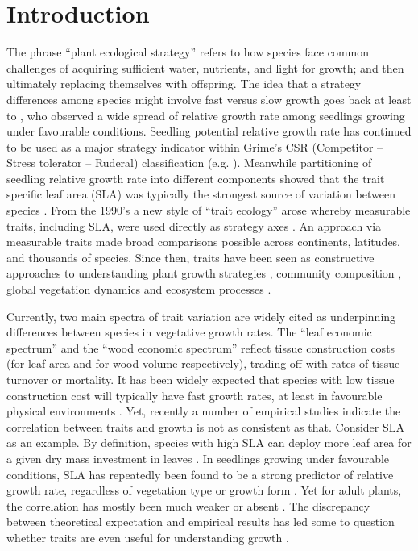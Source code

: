 \documentclass[a4paper,11pt]{article}
\begin{document}
\section*{Introduction}\label{introduction}

The phrase ``plant ecological strategy'' refers to how species face common challenges of acquiring sufficient water, nutrients, and light for growth; and then ultimately replacing themselves with offspring. The idea that a strategy differences among species might involve fast versus slow growth goes back at least to \citet{Grime:1975gr}, who observed a wide spread of relative growth rate  among seedlings growing under favourable conditions. Seedling potential relative growth rate has continued to be used as a major strategy indicator within Grime's CSR (Competitor -- Stress tolerator -- Ruderal) classification (e.g. \citealt{grime1979plant, Grime:1997wm}). Meanwhile partitioning of seedling relative growth rate into different components showed that the trait specific leaf area (SLA) was typically the strongest source of variation between species \citep{Poorter:1989tx, Rees:2010gk}. From the 1990's a new style of ``trait ecology'' arose whereby measurable traits, including SLA, were used directly as strategy axes \citep{Westoby:2002ft}. An approach via measurable traits made broad comparisons possible across continents, latitudes, and thousands of species. Since then, traits have been seen as constructive approaches to understanding plant growth strategies \citep{Westoby:2002ft}, community composition \citep{Lavorel:2002ff,Shipley:2006ie}, global vegetation dynamics \citep{Scheiter:2013ed} and ecosystem processes \citep{Lavorel:2002ff}.

Currently, two main spectra of trait variation are widely cited as underpinning differences between species in vegetative growth rates. The ``leaf economic spectrum'' \citep{Wright:2004jb} and the ``wood economic spectrum'' \citep{Chave:2009iy} reflect tissue construction costs (for leaf area and for wood volume respectively), trading off with rates of tissue turnover or mortality. It has been widely expected that species with low tissue construction cost will typically have fast growth rates, at least in favourable physical environments \citep[e.g.][]{MullerLandau:2004dc,Poorter:2008iu,Chave:2009iy,Larjavaara:2010bn,Iida:2012jb,Paine:2015df}. Yet, recently a number of empirical studies indicate the correlation between traits and growth is not as consistent as that. Consider SLA as an example. By definition, species with high SLA can deploy more leaf area for a given dry mass investment in leaves \citep{Poorter:1999wd, Reich:1992wm}. In seedlings growing under favourable conditions, SLA has repeatedly been found to be a strong predictor of relative growth rate, regardless of vegetation type or growth form \citep{Lambers:1992bj,Reich:1992wm,Grime:1997wm,Poorter:1999wd,Wright:1999ds}. Yet for adult plants, the correlation has mostly been much weaker or absent \citep{coomes_comparison_1998,Poorter:2008iu,Aiba:2009ft,Easdale:2009gv,Wright:2010tp}. The discrepancy between theoretical expectation and empirical results has led some to question whether traits are even useful for understanding growth \citep{Wright:2010tp, Paine:2015df}.
\end{document}
